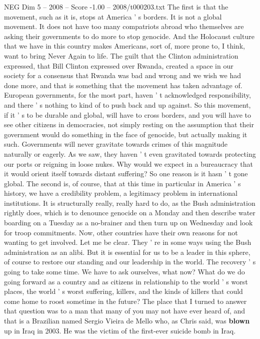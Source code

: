 \begin{textsample}{NEG Dim 5 – 2008 – Score -1.00 – 2008/t000203.txt}
The first is that the movement, such as it is, stops at America ' s borders.
It is not a global movement.
It does not have too many compatriots abroad who themselves are asking their governments to do more to stop genocide.
And the Holocaust culture that we have in this country makes Americans, sort of, more prone to, I think, want to bring Never Again to life.
The guilt that the Clinton administration expressed, that Bill Clinton expressed over Rwanda, created a space in our society for a consensus that Rwanda was bad and wrong and we wish we had done more, and that is something that the movement has taken advantage of.
European governments, for the most part, haven ' t acknowledged responsibility, and there ' s nothing to kind of to push back and up against.
So this movement, if it ' s to be durable and global, will have to cross borders, and you will have to see other citizens in democracies, not simply resting on the assumption that their government would do something in the face of genocide, but actually making it such.
Governments will never gravitate towards crimes of this magnitude naturally or eagerly.
As we saw, they haven ' t even gravitated towards protecting our ports or reigning in loose nukes.
Why would we expect in a bureaucracy that it would orient itself towards distant suffering?
So one reason is it hasn ' t gone global.
The second is, of course, that at this time in particular in America ' s history, we have a credibility problem, a legitimacy problem in international institutions.
It is structurally really, really hard to do, as the Bush administration rightly does, which is to denounce genocide on a Monday and then describe water boarding on a Tuesday as a no-brainer and then turn up on Wednesday and look for troop commitments.
Now, other countries have their own reasons for not wanting to get involved.
Let me be clear.
They ' re in some ways using the Bush administration as an alibi.
But it is essential for us to be a leader in this sphere, of course to restore our standing and our leadership in the world.
The recovery ' s going to take some time.
We have to ask ourselves, what now?
What do we do going forward as a country and as citizens in relationship to the world ' s worst places, the world ' s worst suffering, killers, and the kinds of killers that could come home to roost sometime in the future?
The place that I turned to answer that question was to a man that many of you may not have ever heard of, and that is a Brazilian named Sergio Vieira de Mello who, as Chris said, was \textbf{blown} up in Iraq in 2003.
He was the victim of the first-ever suicide bomb in Iraq.

\end{textsample}
